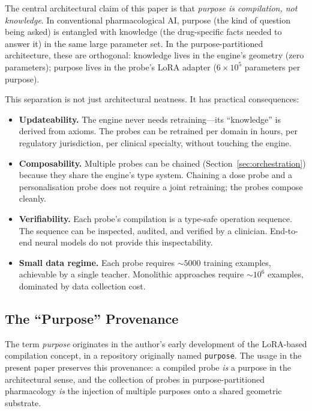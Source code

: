 \documentclass[11pt,twocolumn,a4paper]{article}
\theoremstyle{definition}
\theoremstyle{remark}
\begin{document}
The central architectural claim of this paper is that \emph{purpose is compilation, not knowledge}. In conventional pharmacological AI, purpose (the kind of question being asked) is entangled with knowledge (the drug-specific facts needed to answer it) in the same large parameter set. In the purpose-partitioned architecture, these are orthogonal: knowledge lives in the engine's geometry (zero parameters); purpose lives in the probe's LoRA adapter ($6 \times 10^5$ parameters per purpose).

This separation is not just architectural neatness. It has practical consequences:

\begin{itemize}[nosep,leftmargin=*]
\item \textbf{Updateability.} The engine never needs retraining---its ``knowledge'' is derived from axioms. The probes can be retrained per domain in hours, per regulatory jurisdiction, per clinical specialty, without touching the engine.
\item \textbf{Composability.} Multiple probes can be chained (Section~\ref{sec:orchestration}) because they share the engine's type system. Chaining a dose probe and a personalisation probe does not require a joint retraining; the probes compose cleanly.
\item \textbf{Verifiability.} Each probe's compilation is a type-safe operation sequence. The sequence can be inspected, audited, and verified by a clinician. End-to-end neural models do not provide this inspectability.
\item \textbf{Small data regime.} Each probe requires $\sim\!5000$ training examples, achievable by a single teacher. Monolithic approaches require $\sim\!10^6$ examples, dominated by data collection cost.
\end{itemize}

\subsection{The ``Purpose'' Provenance}

The term \emph{purpose} originates in the author's early development of the LoRA-based compilation concept, in a repository originally named \texttt{purpose}. The usage in the present paper preserves this provenance: a compiled probe \emph{is} a purpose in the architectural sense, and the collection of probes in purpose-partitioned pharmacology \emph{is} the injection of multiple purposes onto a shared geometric substrate.
\end{document}
